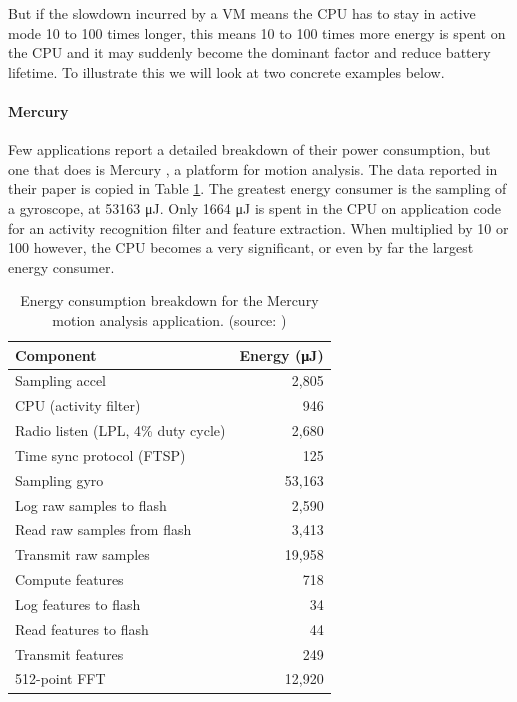 But if the slowdown incurred by a VM means the CPU has to stay in active mode 10 to 100 times longer, this means 10 to 100 times more energy is spent on the CPU and it may suddenly become the dominant factor and reduce battery lifetime. To illustrate this we will look at two concrete examples below.

\paragraph{Mercury}
Few applications report a detailed breakdown of their power consumption, but one that does is Mercury \cite{Lorincz:2009kt}, a platform for motion analysis. The data reported in their paper is copied in Table \ref{tbl-mercury-energy}. The greatest energy consumer is the sampling of a gyroscope, at 53163 μJ. Only 1664 μJ is spent in the CPU on application code for an activity recognition filter and feature extraction. When multiplied by 10 or 100 however, the CPU becomes a very significant, or even by far the largest energy consumer.

\begin{table}
\caption{Energy consumption breakdown for the Mercury motion analysis application. (source: \cite{Lorincz:2009kt})}
\label{tbl-mercury-energy}
    \begin{tabular}{lr}
    \toprule
    Component                          & Energy (μJ) \\
    \midrule
    \midrule
    Sampling accel                     &  2,805 \\
    CPU (activity filter)              &    946 \\
    Radio listen (LPL, 4\% duty cycle) &  2,680 \\
    Time sync protocol (FTSP)          &    125 \\
    Sampling gyro                      & 53,163 \\
    Log raw samples to flash           &  2,590 \\
    Read raw samples from flash        &  3,413 \\
    Transmit raw samples               & 19,958 \\
    \midrule
    Compute features                   &    718 \\
    Log features to flash              &     34 \\
    Read features to flash             &     44 \\
    Transmit features                  &    249 \\
    \midrule
    512-point FFT                      & 12,920 \\
    \bottomrule
    \end{tabular}
\end{table}


